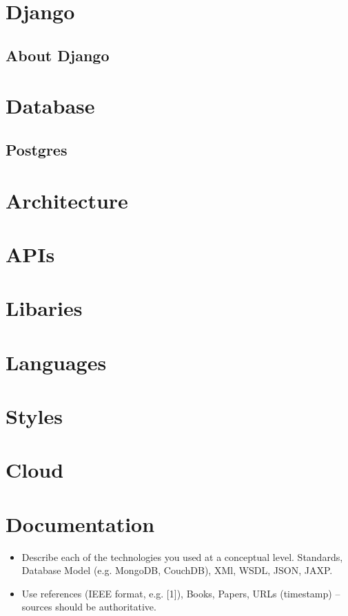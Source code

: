 \section{Django}
\subsection{About Django}

\section{Database}
\subsection{Postgres}

\section{Architecture}

\section{APIs}

\section{Libaries}

\section{Languages}

\section{Styles}

\section{Cloud}

\section{Documentation}
\begin{itemize}
\item Describe each of the technologies you used at a conceptual level. Standards, Database Model (e.g. MongoDB, CouchDB), XMl, WSDL, JSON, JAXP.
\item Use references (IEEE format, e.g. [1]), Books, Papers, URLs (timestamp) – sources should be authoritative. 
\end{itemize}

